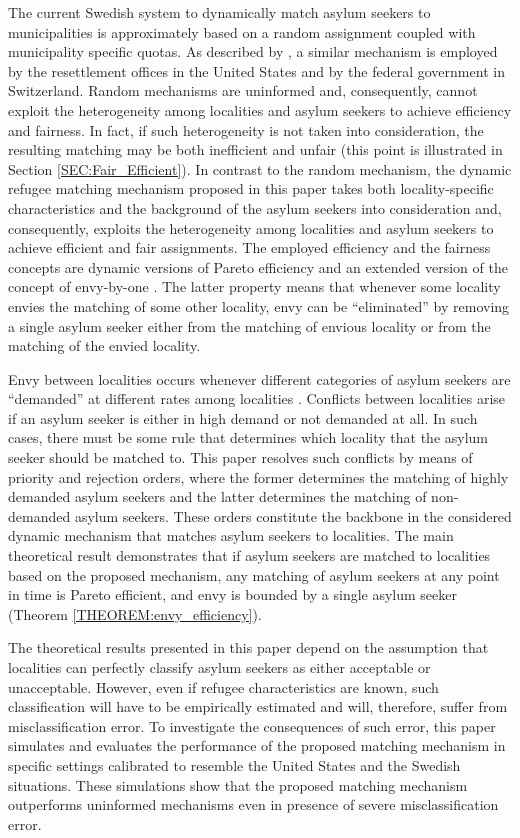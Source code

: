 \documentclass[12pt,fleqn]{article}
\begin{document}
The current Swedish system to dynamically match asylum seekers to municipalities is approximately based on a random assignment coupled with municipality specific quotas. As described by \citet[][p.325]{bib:BansakEtAl}, a similar mechanism is employed by the resettlement offices in the United States and by the federal government in Switzerland. Random mechanisms are uninformed and, consequently, cannot exploit the heterogeneity among localities and asylum seekers to achieve efficiency and fairness. In fact, if such heterogeneity is not taken into consideration, the resulting matching may be both inefficient and unfair (this point is illustrated in Section \ref{SEC:Fair_Efficient}). In contrast to the random mechanism, the dynamic refugee matching mechanism proposed in this paper takes both locality-specific characteristics and the background of the asylum seekers into consideration and, consequently, exploits the heterogeneity among localities and asylum seekers to achieve efficient and fair assignments. The employed efficiency and the fairness concepts are dynamic versions of Pareto efficiency and an extended version of the concept of envy-by-one \citep{bib:Budish}. The latter property means that whenever some locality envies the matching of some other locality, envy can be ``eliminated'' by removing a single asylum seeker either from the matching of envious locality or from the matching of the envied locality.

Envy between localities occurs whenever different categories of asylum seekers are ``demanded'' at different rates among localities \citep{bib:BansakEtAl}. Conflicts between localities arise if an asylum seeker is either in high demand or not demanded at all. In such cases, there must be some rule that determines which locality that the asylum seeker should be matched to. This paper resolves such conflicts by means of priority and rejection orders, where the former determines the matching of highly demanded asylum seekers and the latter determines the matching of non-demanded asylum seekers. These orders constitute the backbone in the considered dynamic mechanism that matches asylum seekers to localities. The main theoretical result demonstrates that if asylum seekers are matched to localities based on the proposed mechanism, any matching of asylum seekers at any point in time is Pareto efficient, and envy is bounded by a single asylum seeker (Theorem \ref{THEOREM:envy_efficiency}).

The theoretical results presented in this paper depend on the assumption that localities can perfectly classify asylum seekers as either acceptable or unacceptable. However, even if refugee characteristics are known, such classification will have to be empirically estimated and will, therefore, suffer from misclassification error. To investigate the consequences of such error, this paper simulates and evaluates the performance of the proposed matching mechanism in specific settings calibrated to resemble the United States and the Swedish situations. These simulations show that the proposed matching mechanism outperforms uninformed mechanisms even in presence of severe misclassification error.
\end{document}
